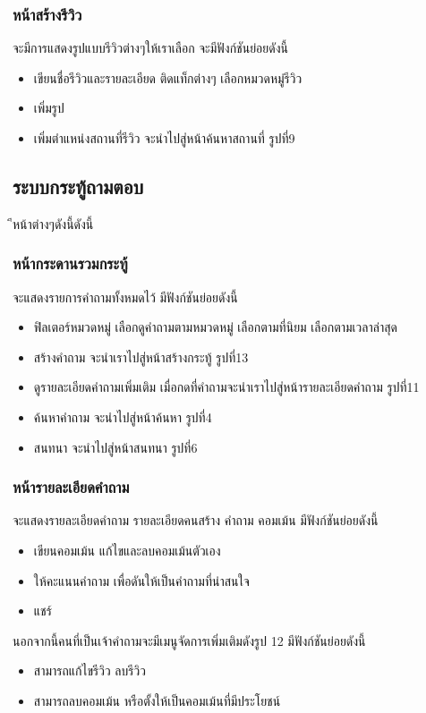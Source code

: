 \subsubsection{หน้าสร้างรีวิว}
จะมีการแสดงรูปแบบรีวิวต่างๆให้เราเลือก จะมีฟังก์ชันย่อยดังนี้
\begin{itemize}
  \item เขียนชื่อรีวิวและรายละเอียด ติดแท็กต่างๆ เลือกหมวดหมู่รีวิว
  \item เพิ่มรูป
  \item เพิ่มตำแหน่งสถานที่รีวิว จะนำไปสู่หน้าค้นหาสถานที่ รูปที่9
 \end{itemize}


\subsection{ระบบกระทู้ถามตอบ}
ีหน้าต่างๆดังนี้ดังนี้
\subsubsection{หน้ากระดานรวมกระทู้}
จะแสดงรายการคำถามทั้งหมดไว้ มีฟังก์ชันย่อยดังนี้
\begin{itemize}
  \item ฟิลเตอร์หมวดหมู่ เลือกดูคำถามตามหมวดหมู่ เลือกตามที่นิยม เลือกตามเวลาล่าสุด 
  \item สร้างคำถาม จะนำเราไปสู่หน้าสร้างกระทู้ รูปที่13
  \item ดูรายละเอียดคำถามเพิ่มเติม เมื่อกดที่คำถามจะนำเราไปสู่หน้ารายละเอียดคำถาม รูปที่11
  \item ค้นหาคำถาม จะนำไปสู่หน้าค้นหา รูปที่4
  \item สนทนา จะนำไปสู่หน้าสนทนา รูปที่6
 \end{itemize}


\subsubsection{หน้ารายละเอียดคำถาม}
จะแสดงรายละเอียดคำถาม รายละเอียดคนสร้าง คำถาม คอมเม้น มีฟังก์ชันย่อยดังนี้
\begin{itemize}
  \item เขียนคอมเม้น แก้ไขและลบคอมเม้นตัวเอง
  \item ให้คะแนนคำถาม เพื่อดันให้เป็นคำถามที่น่าสนใจ
  \item แชร์
 \end{itemize}
 นอกจากนี้คนที่เป็นเจ้าคำถามจะมีเมนูจัดการเพิ่มเติมดังรูป 12 มีฟังก์ชันย่อยดังนี้
 \begin{itemize}
   \item สามารถแก้ไขรีวิว ลบรีวิว
   \item สามารถลบคอมเม้น หรือตั้งให้เป็นคอมเม้นที่มีประโยชน์
  \end{itemize}

